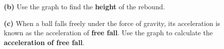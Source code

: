 \documentclass[A4,12pt]{article}
\begin{document}
\begin{enumerate}[label=\bfseries (\arabic*)]
\begin{itemize}
    \item[\bf (b)] Use the graph to find the \textbf{height} of the rebound.
    \item[\bf (c)] When a ball falls freely under the force  of gravity, its acceleration is known as the acceleration of \textbf{free fall}. Use the graph to calculate the \textbf{acceleration of free fall}.
\end{itemize}





























\end{enumerate}
\end{document}
